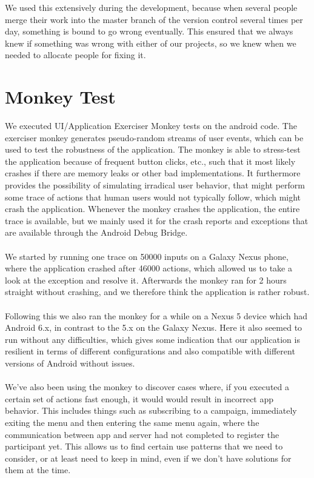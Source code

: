 We used this extensively during the development, because when several people merge their work into the master branch of the version control several times per day, something is bound to go wrong eventually. This ensured that we always knew if something was wrong with either of our projects, so we knew when we needed to allocate people for fixing it. 

\section{Monkey Test}
\label{sec:monkey_test}
We executed UI/Application Exerciser Monkey tests on the android code. The exerciser monkey generates pseudo-random streams of user events, which can be used to test the robustness of the application. The monkey is able to stress-test the application because of frequent button clicks, etc., such that it most likely crashes if there are memory leaks or other bad implementations. It furthermore provides the possibility of simulating irradical user behavior, that might perform some trace of actions that human users would not typically follow, which might crash the application. Whenever the monkey crashes the application, the entire trace is available, but we mainly used it for the crash reports and exceptions that are available through the Android Debug Bridge. 
\\\\
We started by running one trace on 50000 inputs on a Galaxy Nexus phone, where the application crashed after 46000 actions, which allowed us to take a look at the exception and resolve it. Afterwards the monkey ran for 2 hours straight without crashing, and we therefore think the application is rather robust.
\\\\
Following this we also ran the monkey for a while on a Nexus 5 device which had Android 6.x, in contrast to the 5.x on the Galaxy Nexus. Here it also seemed to run without any difficulties, which gives some indication that our application is resilient in terms of different configurations and also compatible with different versions of Android without issues.
\\\\
We've also been using the monkey to discover cases where, if you executed a certain set of actions fast enough, it would would result in incorrect app behavior. This includes things such as subscribing to a campaign, immediately exiting the menu and then entering the same menu again, where the communication between app and server had not completed to register the participant yet. This allows us to find certain use patterns that we need to consider, or at least need to keep in mind, even if we don't have solutions for them at the time.
